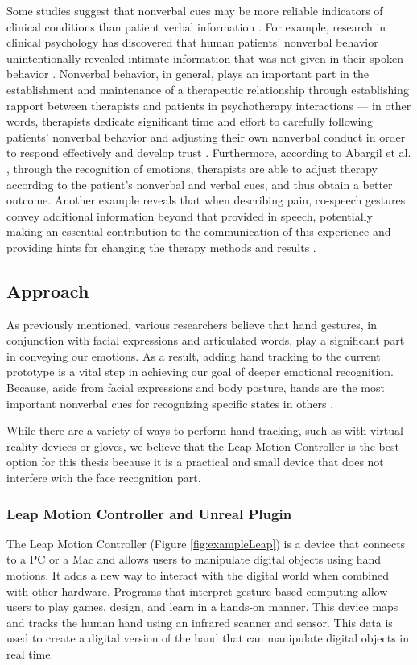 Some studies suggest that nonverbal cues may be more reliable indicators of clinical conditions than patient verbal information \cite{KNA13}. For example, research in clinical psychology has discovered that human patients' nonverbal behavior unintentionally revealed intimate information that was not given in their spoken behavior \cite{FAB06, KLE03}. Nonverbal behavior, in general, plays an important part in the establishment and maintenance of a therapeutic relationship through establishing rapport between therapists and patients in psychotherapy interactions \cite{KLE03} — in other words, therapists dedicate significant time and effort to carefully following patients' nonverbal behavior and adjusting their own nonverbal conduct in order to respond effectively and develop trust \cite{ABA21}. Furthermore, according to Abargil et al. \cite{ABA21}, through the recognition of emotions, therapists are able to adjust therapy according to the patient's nonverbal and verbal cues, and thus obtain a better outcome. Another example reveals that when describing pain, co-speech gestures convey additional information beyond that provided in speech, potentially making an essential contribution to the communication of this experience and providing hints for changing the therapy methods and results \cite{ROW16, REI22}.

\subsection{Approach}
As previously mentioned, various researchers believe that hand gestures, in conjunction with facial expressions and articulated words, play a significant part in conveying our emotions. As a result, adding hand tracking to the current prototype is a vital step in achieving our goal of deeper emotional recognition. Because, aside from facial expressions and body posture, hands are the most important nonverbal cues for recognizing specific states in others \cite{WAX97, REI22}.

While there are a variety of ways to perform hand tracking, such as with virtual reality devices or gloves, we believe that the Leap Motion Controller is the best option for this thesis because it is a practical and small device that does not interfere with the face recognition part.

\subsubsection{Leap Motion Controller and Unreal Plugin}
The Leap Motion Controller (Figure \ref{fig:exampleLeap}) is a device that connects to a PC or a Mac and allows users to manipulate digital objects using hand motions. It adds a new way to interact with the digital world when combined with other hardware. Programs that interpret gesture-based computing allow users to play games, design, and learn in a hands-on manner. This device maps and tracks the human hand using an infrared scanner and sensor. This data is used to create a digital version of the hand that can manipulate digital objects in real time.

